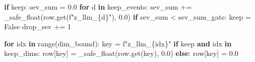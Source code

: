 \documentclass[
  11pt,
  a4paper]{article}
\newenvironment{Shaded}{}{}
\newcommand{\BuiltInTok}[1]{#1}
\newcommand{\ControlFlowTok}[1]{\textcolor[rgb]{0.00,0.44,0.13}{\textbf{#1}}}
\newcommand{\DecValTok}[1]{\textcolor[rgb]{0.25,0.63,0.44}{#1}}
\newcommand{\FloatTok}[1]{\textcolor[rgb]{0.25,0.63,0.44}{#1}}
\newcommand{\KeywordTok}[1]{\textcolor[rgb]{0.00,0.44,0.13}{\textbf{#1}}}
\newcommand{\NormalTok}[1]{#1}
\newcommand{\OperatorTok}[1]{\textcolor[rgb]{0.40,0.40,0.40}{#1}}
\newcommand{\SpecialCharTok}[1]{\textcolor[rgb]{0.25,0.44,0.63}{#1}}
\newcommand{\SpecialStringTok}[1]{\textcolor[rgb]{0.73,0.40,0.53}{#1}}
\newcommand{\VariableTok}[1]{\textcolor[rgb]{0.10,0.09,0.49}{#1}}
\begin{document}
\begin{Shaded}
\begin{Highlighting}[]
    \ControlFlowTok{if}\NormalTok{ keep:}
\NormalTok{        sev\_sum }\OperatorTok{=} \FloatTok{0.0}
        \ControlFlowTok{for}\NormalTok{ d }\KeywordTok{in}\NormalTok{ keep\_events:}
\NormalTok{            sev\_sum }\OperatorTok{+=}\NormalTok{ \_safe\_float(row.get(}\SpecialStringTok{f"z\_llm\_}\SpecialCharTok{\{d\}}\SpecialStringTok{"}\NormalTok{), }\FloatTok{0.0}\NormalTok{)}
        \ControlFlowTok{if}\NormalTok{ sev\_sum }\OperatorTok{\textless{}}\NormalTok{ sev\_sum\_gate:}
\NormalTok{            keep }\OperatorTok{=} \VariableTok{False}
\NormalTok{            drop\_sev }\OperatorTok{+=} \DecValTok{1}

    \ControlFlowTok{for}\NormalTok{ idx }\KeywordTok{in} \BuiltInTok{range}\NormalTok{(dim\_bound):}
\NormalTok{        key }\OperatorTok{=} \SpecialStringTok{f"z\_llm\_}\SpecialCharTok{\{}\NormalTok{idx}\SpecialCharTok{\}}\SpecialStringTok{"}
        \ControlFlowTok{if}\NormalTok{ keep }\KeywordTok{and}\NormalTok{ idx }\KeywordTok{in}\NormalTok{ keep\_dims:}
\NormalTok{            row[key] }\OperatorTok{=}\NormalTok{ \_safe\_float(row.get(key), }\FloatTok{0.0}\NormalTok{)}
        \ControlFlowTok{else}\NormalTok{:}
\NormalTok{            row[key] }\OperatorTok{=} \FloatTok{0.0}
\end{Highlighting}
\end{Shaded}
\end{document}
